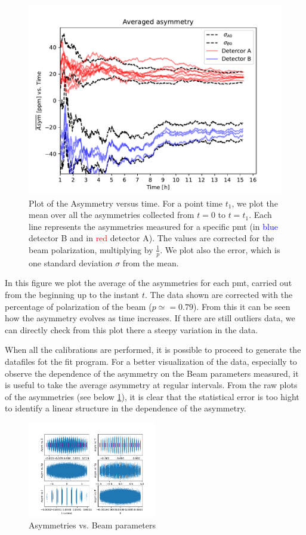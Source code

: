 \begin{figure}[hbtp]
\centering
\includegraphics[width = 0.8 \textwidth]{Analysis/Dataselection/AveragedAsymmetry.pdf}
\caption{Plot of the Asymmetry versus time. For a point time $t_{1}$, we plot the mean over all the asymmetries collected from $t = 0$ to $t = t_{1}$. Each line represents the asymmetries measured for a specific pmt (in \textcolor{blue}{blue} detector B and in \textcolor{red}{red} detector A). The values are corrected for the beam polarization, multiplying by $\frac{1}{p}$. We plot also the error, which is one standard deviation $\sigma$ from the mean.}
\end{figure}

In this figure we plot the average of the asymmetries for each pmt, carried out from the beginning up to the instant $t$. The data shown are corrected with the percentage of polarization of the beam ($p \simeq = 0.79$). From this it can be seen how the asymmetry evolves as time increases. If there are still outliers data, we can directly check from this plot there a steepy variation in the data. 


When all the calibrations are performed, it is possible to proceed to generate the datafiles fot the fit program.
For a better visualization of the data, especially to observe the dependence of the asymmetry on the Beam parameters measured, it is useful to take the average asymmetry at regular intervals. From the raw plots of the asymmetries (see below \ref{fig:asyvsparam}), it is clear that the statistical error is too hight to identify a linear structure in the dependence of the asymmetry. 

\begin{figure}[hbtp]
\centering
\includegraphics[width = 0.5\textwidth]{Analysis/Asym_vs_monitor.png}
\caption{Asymmetries vs. Beam parameters}
\label{fig:asyvsparam}
\end{figure}

